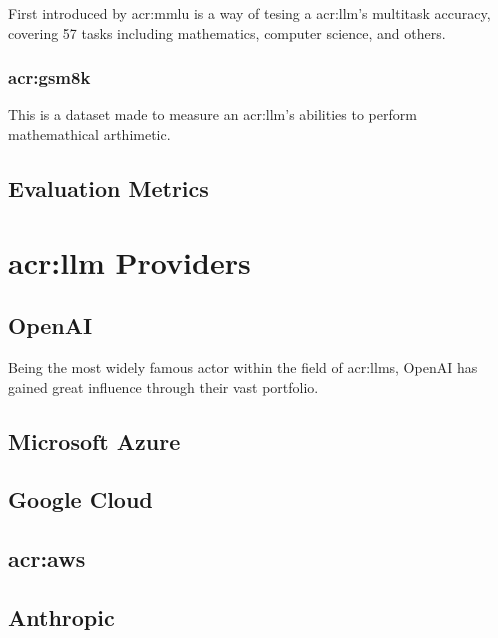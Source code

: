First introduced by \cite{hendrycksMeasuringMassiveMultitask2021} \acrlong{acr:mmlu} is a way of tesing a \acrlong{acr:llm}'s multitask accuracy, covering 57 tasks including mathematics, computer science, and others.

\subsubsection[Grade School Math 8K]{\acrlong{acr:gsm8k}}

This is a dataset made to measure an \acrshort{acr:llm}'s abilities to perform mathemathical arthimetic.

\subsection{Evaluation Metrics}\label{subsec:evaluation-metrics}


\section[LLM providers]{\acrfull{acr:llm} Providers}\label{sec:llm-providers}

\subsection{OpenAI}\label{subsec:openai}

Being the most widely famous actor within the field of \glspl{acr:llm}, OpenAI has gained great influence through their vast portfolio.

\subsection{Microsoft Azure}\label{subsec:microsoft-azure}

\subsection{Google Cloud}\label{subsec:google-cloud}

\subsection[Amazon Web Services (AWS)]{\acrlong{acr:aws}}\label{subsec:aws}

\subsection{Anthropic}\label{subsec:anthropic}

